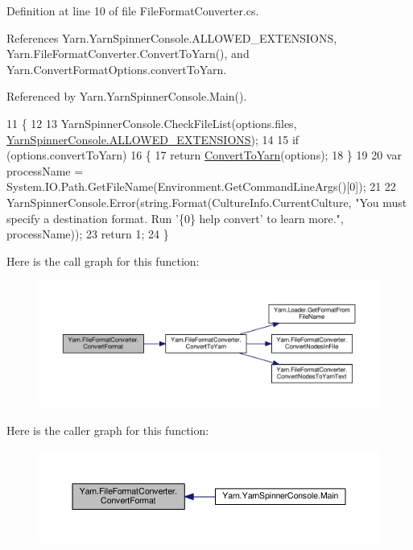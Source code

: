 Definition at line 10 of file File\-Format\-Converter.\-cs.



References Yarn.\-Yarn\-Spinner\-Console.\-A\-L\-L\-O\-W\-E\-D\-\_\-\-E\-X\-T\-E\-N\-S\-I\-O\-N\-S, Yarn.\-File\-Format\-Converter.\-Convert\-To\-Yarn(), and Yarn.\-Convert\-Format\-Options.\-convert\-To\-Yarn.



Referenced by Yarn.\-Yarn\-Spinner\-Console.\-Main().


\begin{DoxyCode}
11         \{
12 
13             YarnSpinnerConsole.CheckFileList(options.files, 
      \hyperlink{a00174_a0979de7ea02c8c0375b8220a12e6575e}{YarnSpinnerConsole.ALLOWED\_EXTENSIONS});
14 
15             \textcolor{keywordflow}{if} (options.convertToYarn)
16             \{
17                 \textcolor{keywordflow}{return} \hyperlink{a00102_a1e6cd39b0c813f21da278367dcff76d2}{ConvertToYarn}(options);
18             \}
19 
20             var processName = System.IO.Path.GetFileName(Environment.GetCommandLineArgs()[0]);
21 
22             YarnSpinnerConsole.Error(string.Format(CultureInfo.CurrentCulture, \textcolor{stringliteral}{"You must specify a
       destination format. Run '\{0\} help convert' to learn more."}, processName));
23             \textcolor{keywordflow}{return} 1;
24         \}
\end{DoxyCode}


Here is the call graph for this function\-:
\nopagebreak
\begin{figure}[H]
\begin{center}
\leavevmode
\includegraphics[width=350pt]{a00102_aa4db4ccac799c5f047a8b1a9efbe109d_cgraph}
\end{center}
\end{figure}




Here is the caller graph for this function\-:
\nopagebreak
\begin{figure}[H]
\begin{center}
\leavevmode
\includegraphics[width=350pt]{a00102_aa4db4ccac799c5f047a8b1a9efbe109d_icgraph}
\end{center}
\end{figure}


